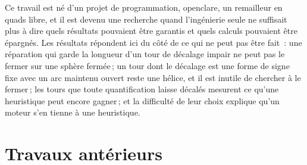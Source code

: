 \documentclass[11pt,a4paper]{article}
\begin{document}
Ce travail est né d'un projet de programmation, openclare, un remailleur en
quads libre, et il est devenu une recherche quand l'ingénierie seule ne
suffisait plus à dire quels résultats pouvaient être garantis et quels calculs
pouvaient être épargnés. Les résultats répondent ici du côté de ce qui ne peut
pas être fait~: une réparation qui garde la longueur d'un tour de décalage
impair ne peut pas le fermer sur une sphère fermée\,; un tour dont le décalage
est une forme de signe fixe avec un arc maintenu ouvert reste une hélice, et
il est inutile de chercher à le fermer\,; les tours que toute quantification
laisse décalés mesurent ce qu'une heuristique peut encore gagner\,; et la
difficulté de leur choix explique qu'un moteur s'en tienne à une heuristique.

\section{Travaux antérieurs}\label{sec:related}
\end{document}
